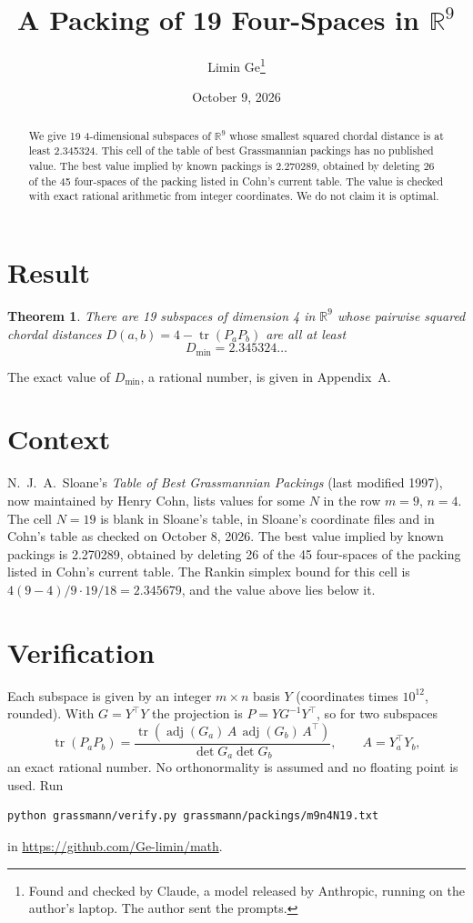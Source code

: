 \documentclass[11pt,a4paper]{article}
\title{A Packing of 19 Four-Spaces in $\mathbb{R}^{9}$}
\author{Limin Ge\thanks{Found and checked by Claude, a model released by Anthropic, running on the author's laptop. The author sent the prompts.}}
\date{October 9, 2026}
\newtheorem*{theorem}{Theorem}
\begin{document}
\maketitle
\begin{abstract}
We give 19 4-dimensional subspaces of $\mathbb{R}^{9}$ whose smallest squared chordal distance is at least 2.345324. This cell of the table of best Grassmannian packings has no published value. The best value implied by known packings is 2.270289, obtained by deleting 26 of the 45 four-spaces of the packing listed in Cohn's current table. The value is checked with exact rational arithmetic from integer coordinates. We do not claim it is optimal.
\end{abstract}

\section{Result}
\begin{theorem}
There are 19 subspaces of dimension 4 in $\mathbb{R}^{9}$ whose pairwise squared chordal distances $D(a,b) = 4 - \operatorname{tr}(P_aP_b)$ are all at least
\[ D_{\min} = 2.345324\ldots \]
\end{theorem}
The exact value of $D_{\min}$, a rational number, is given in Appendix~A.


\section{Context}
N.~J.~A.~Sloane's \emph{Table of Best Grassmannian Packings} (last modified 1997), now maintained by Henry Cohn, lists values for some $N$ in the row $m=9$, $n=4$. The cell $N=19$ is blank in Sloane's table, in Sloane's coordinate files and in Cohn's table as checked on October 8, 2026. The best value implied by known packings is 2.270289, obtained by deleting 26 of the 45 four-spaces of the packing listed in Cohn's current table. The Rankin simplex bound for this cell is $4(9-4)/9\cdot 19/18 = 2.345679$, and the value above lies below it.


\section{Verification}
Each subspace is given by an integer $m\times n$ basis $Y$ (coordinates times $10^{12}$, rounded). With $G=Y^\top Y$ the projection is $P=YG^{-1}Y^\top$, so for two subspaces
\[ \operatorname{tr}(P_aP_b)=\frac{\operatorname{tr}(\operatorname{adj}(G_a)\,A\,\operatorname{adj}(G_b)\,A^\top)}{\det G_a\det G_b},\qquad A=Y_a^\top Y_b, \]
an exact rational number. No orthonormality is assumed and no floating point is used. Run
\begin{verbatim}
python grassmann/verify.py grassmann/packings/m9n4N19.txt
\end{verbatim}
in \url{https://github.com/Ge-limin/math}.
\end{document}
